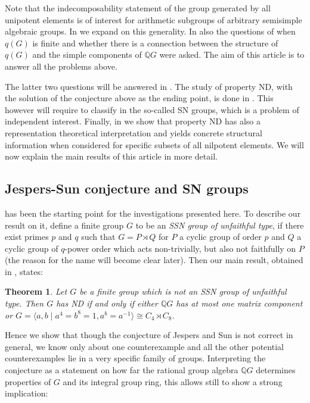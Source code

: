 \documentclass[a4paper,10pt]{amsart}
\newtheorem{maintheorem}{Theorem}
\theoremstyle{definition}
\theoremstyle{remark}
\newcommand{\Q}{{\mathbb Q}}
\begin{document}
Note that the indecomposability statement of the group generated by all unipotent elements is of interest for arithmetic subgroups of arbitrary semisimple algebraic groups. In  we expand on this generality. In \cite[Section 6]{JespersSun} also the questions of when $q(G)$ is finite and whether there is a connection between the structure of $q(G)$ and the simple components of $\Q G$ were asked. The aim of this article is to answer all the problems above.

The latter two questions will be answered in . The study of property ND, with the solution of the conjecture above as the ending point, is done in . This however will require to classify in  the so-called SN groups, which is a problem of independent interest. Finally, in  we show that property ND has also a representation theoretical interpretation and yields concrete structural information when considered for specific subsets of all nilpotent elements. We will now explain the main results of this article in more detail.

\subsection*{Jespers-Sun conjecture and SN groups}
 has been the starting point for the investigations presented here. To describe our result on it, define a finite group $G$ to be an \emph{SSN group of unfaithful type}, if there exist primes $p$ and $q$ such that $G = P \rtimes Q$ for $P$ a cyclic group of order $p$ and $Q$ a cyclic group of $q$-power order which acts non-trivially, but also not faithfully on $P$ (the reason for the name will become clear later). Then our main result, obtained in , states:

\begin{maintheorem}\label{Summary theorem ND}
Let $G$ be a finite group which is not an SSN group of unfaithful type. Then $G$ has ND if and only if either $\Q G$ has at most one matrix component or $G  = \langle a,b \mid a^4=b^8 =1, a^b =a^{-1} \rangle \cong C_4 \rtimes C_8$.
\end{maintheorem} 

Hence we show that though the conjecture of Jespers and Sun is not correct in general, we know only about one counterexample and all the other potential counterexamples lie in a very specific family of groups. Interpreting the conjecture as a statement on how far the rational group algebra $\mathbb{Q}G$  determines properties of $G$ and its integral group ring, this allows still to show a strong implication:
\end{document}
